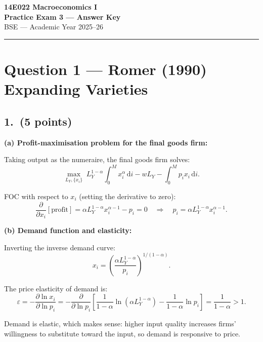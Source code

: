 \documentclass[a4paper,11pt]{article}
\newcommand{\dd}{\mathrm{d}}
\begin{document}

\begin{center}
    {\LARGE \textbf{14E022 Macroeconomics I}}\\[6pt]
    {\Large \textbf{Practice Exam 3 --- Answer Key}}\\[8pt]
    {\large BSE --- Academic Year 2025--26}
\end{center}

\noindent\rule{\textwidth}{0.4pt}

\section{Question 1 --- Romer (1990) Expanding Varieties}

\subsection*{1.\ (5 points)}

\begin{answerbox}
\textbf{(a) Profit-maximisation problem for the final goods firm:}

Taking output as the numeraire, the final goods firm solves:
\[
    \max_{L_Y,\{x_i\}} \; L_Y^{1-\alpha}\int_0^M x_i^\alpha\,\dd i - wL_Y - \int_0^M p_i x_i\,\dd i.
\]

FOC with respect to $x_i$ (setting the derivative to zero):
\[
    \frac{\partial}{\partial x_i}\left[\text{profit}\right]
    = \alpha L_Y^{1-\alpha}x_i^{\alpha-1} - p_i = 0
    \quad\Longrightarrow\quad
    \boxed{p_i = \alpha L_Y^{1-\alpha}x_i^{\alpha-1}.}
\]

\textbf{(b) Demand function and elasticity:}

Inverting the inverse demand curve:
\[
    x_i = \left(\frac{\alpha L_Y^{1-\alpha}}{p_i}\right)^{1/(1-\alpha)}.
\]

The price elasticity of demand is:
\[
    \varepsilon = -\frac{\partial \ln x_i}{\partial \ln p_i}
    = -\frac{\partial}{\partial \ln p_i}\left[\frac{1}{1-\alpha}\ln(\alpha L_Y^{1-\alpha}) - \frac{1}{1-\alpha}\ln p_i\right]
    = \boxed{\frac{1}{1-\alpha} > 1.}
\]

Demand is elastic, which makes sense: higher input quality increases firms' willingness to substitute toward the input, so demand is responsive to price.
\end{answerbox}
\end{document}
